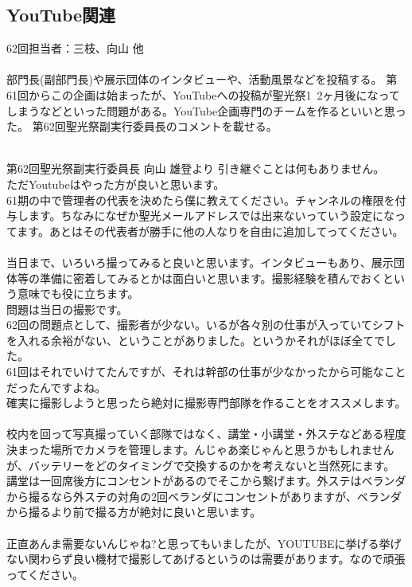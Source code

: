 \documentclass[dvipdfmx,jb5]{jarticle}
\begin{document}
 \subsection{YouTube関連}
62回担当者：三枝、向山 他
\\
\\
 部門長(副部門長)や展示団体のインタビューや、活動風景などを投稿する。
 第61回からこの企画は始まったが、YouTubeへの投稿が聖光祭1~2ヶ月後になってしまうなどといった問題がある。YouTube企画専門のチームを作るといいと思った。
 第62回聖光祭副実行委員長のコメントを載せる。
 \\
 \\
 \begin{itembox}[l]{第62回聖光祭副実行委員長 向山 雄登より}
 引き継ぐことは何もありません。\\
 ただYoutubeはやった方が良いと思います。\\
 61期の中で管理者の代表を決めたら僕に教えてください。チャンネルの権限を付与します。ちなみになぜか聖光メールアドレスでは出来ないっていう設定になってます。あとはその代表者が勝手に他の人なりを自由に追加してってください。\\\\
当日まで、いろいろ撮ってみると良いと思います。インタビューもあり、展示団体等の準備に密着してみるとかは面白いと思います。撮影経験を積んでおくという意味でも役に立ちます。\\
問題は当日の撮影です。\\
62回の問題点として、撮影者が少ない。いるが各々別の仕事が入っていてシフトを入れる余裕がない、ということがありました。というかそれがほぼ全てでした。\\
61回はそれでいけてたんですが、それは幹部の仕事が少なかったから可能なことだったんですよね。\\
確実に撮影しようと思ったら絶対に撮影専門部隊を作ることをオススメします。\\\\
校内を回って写真撮っていく部隊ではなく、講堂・小講堂・外ステなどある程度決まった場所でカメラを管理します。んじゃあ楽じゃんと思うかもしれませんが、バッテリーをどのタイミングで交換するのかを考えないと当然死にます。\\
講堂は一回席後方にコンセントがあるのでそこから繋げます。外ステはベランダから撮るなら外ステの対角の2回ベランダにコンセントがありますが、ベランダから撮るより前で撮る方が絶対に良いと思います。\\\\
正直あんま需要ないんじゃね?と思ってもいましたが、YOUTUBEに挙げる挙げない関わらず良い機材で撮影してあげるというのは需要があります。なので頑張ってください。
 \end{itembox}
\end{document}
